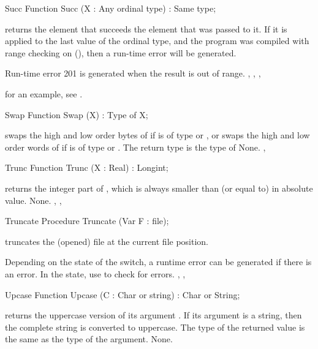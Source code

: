 
\begin{function}{Succ}
\Declaration
Function Succ (X : Any ordinal type) : Same type;

\Description
  returns the element that succeeds the element that was passed
to it. If it is applied to the last value of the ordinal type, and the
program was compiled with range checking on (), then a run-time
error will be generated.

\Errors
Run-time error 201 is generated when the result is out of
range.
\SeeAlso
{}, , , 
\end{function}
for an example, see .
\begin{function}{Swap}
\Declaration
Function Swap (X) : Type of X;

\Description
{} swaps the high and low order bytes of  if  is of
type  or , or swaps the high and low order words of
 if  is of type  or .
The return type is the type of 
\Errors
None.
\SeeAlso
{}, 
\end{function}


\begin{function}{Trunc}
\Declaration
Function Trunc (X : Real) : Longint;

\Description
{} returns the integer part of ,
which is always smaller than (or equal to)  in absolute value.
\Errors
None.
\SeeAlso
{}, , 
\end{function}


\begin{procedure}{Truncate}
\Declaration
Procedure Truncate (Var F : file);

\Description
{} truncates the (opened) file  at the current file
position.

\Errors
Depending on the state of the  switch, a runtime error can be 
generated if there is an error. In the  state, use 
to check for errors.
\SeeAlso
{}, ,
\end{procedure}


\begin{function}{Upcase}
\Declaration
Function Upcase (C : Char or string) : Char or String;

\Description
{} returns the uppercase version of its argument .
If its argument is a string, then the complete string is converted to
uppercase. The type of the returned value is the same as the type of the
argument.
\Errors
None.
\SeeAlso
{}
\end{function}

